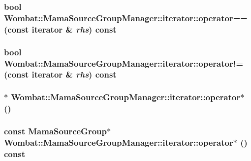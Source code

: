 \label{classWombat_1_1MamaSourceGroupManager_1_1iterator_a57a5e622aff341cea9b58803b45f841a}
\hypertarget{classWombat_1_1MamaSourceGroupManager_1_1iterator_ababd23908bc6182308cde11544a71a00}{
\subsubsection[{operator==}]{\setlength{\rightskip}{0pt plus 5cm}bool Wombat::MamaSourceGroupManager::iterator::operator== (const {\bf iterator} \& {\em rhs}) const}}
\label{classWombat_1_1MamaSourceGroupManager_1_1iterator_ababd23908bc6182308cde11544a71a00}
\hypertarget{classWombat_1_1MamaSourceGroupManager_1_1iterator_a4829e8532893ced05b1c2eea27db2a92}{
\subsubsection[{operator!=}]{\setlength{\rightskip}{0pt plus 5cm}bool Wombat::MamaSourceGroupManager::iterator::operator!= (const {\bf iterator} \& {\em rhs}) const}}
\label{classWombat_1_1MamaSourceGroupManager_1_1iterator_a4829e8532893ced05b1c2eea27db2a92}
\hypertarget{classWombat_1_1MamaSourceGroupManager_1_1iterator_a84bbb4f49ae7aa2a2ecfc10681d56e92}{
\subsubsection[{operator$\ast$}]{$\ast$ Wombat::MamaSourceGroupManager::iterator::operator$\ast$ ()}}
\label{classWombat_1_1MamaSourceGroupManager_1_1iterator_a84bbb4f49ae7aa2a2ecfc10681d56e92}
\hypertarget{classWombat_1_1MamaSourceGroupManager_1_1iterator_aa25f6d94c654308efab982d718b44477}{
\subsubsection[{operator$\ast$}]{\setlength{\rightskip}{0pt plus 5cm}const {\bf MamaSourceGroup}$\ast$ Wombat::MamaSourceGroupManager::iterator::operator$\ast$ () const}}
\label{classWombat_1_1MamaSourceGroupManager_1_1iterator_aa25f6d94c654308efab982d718b44477}



